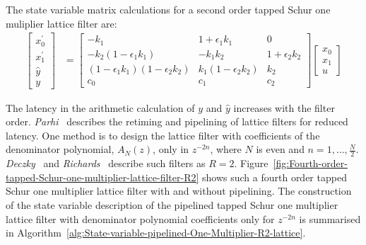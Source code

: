 \documentclass[a4paper,twoside,10pt,english]{article}
\begin{document}
The state variable matrix calculations for a second order tapped Schur one
muliplier lattice filter are:
\begin{align*}
  \left[\begin{array}{c}
    x_{0}^{\prime} \\
    x_{1}^{\prime} \\
    \hat{y} \\
    y\end{array}\right] &= 
  \left[\begin{array}{ccc}- k_{1} & 1+\epsilon_{1} k_{1} & 0\\
-k_{2}\left(1-\epsilon_{1}k_{1}\right) & -k_{1}k_{2}& 1+\epsilon_{2}k_{2} \\
 \left(1-\epsilon_{1}k_{1}\right)\left(1-\epsilon_{2}k_{2}\right) &
   k_{1}\left(1-\epsilon_{2}k_{2}\right) & k_{2} \\
 c_{0} & c_{1} & c_{2} \end{array}\right] \left[\begin{array}{c}
    x_{0} \\
    x_{1} \\
    u \end{array} \right]
\end{align*}

The latency in the arithmetic calculation of $y$ and $\hat{y}$
increases with the filter order. \emph{Parhi}~\cite[Chapter 4 and Section 12.8]
{Parhi_VLSIDigitalSignalProcessingSystems} describes the retiming and pipelining
of lattice filters for reduced latency. One method is to design the lattice
filter with coefficients of the denominator polynomial, $A_{N}\left(z\right)$,
only in $z^{-2n}$, where $N$ is even and $n=1,\hdots,\frac{N}{2}$.
\emph{Deczky}~\cite{Deczky_MinPSynthesisIIRDigitalFilters} and
\emph{Richards}~\cite{Richards_DeczkyRecursiveDecimator} describe such filters
as $R=2$.
Figure~\ref{fig:Fourth-order-tapped-Schur-one-multiplier-lattice-filter-R2}
shows such a fourth order tapped Schur one multiplier lattice filter with and
without pipelining.
The construction of the state variable description of the pipelined tapped Schur
one multiplier lattice filter with denominator polynomial coefficients only for
$z^{-2n}$ is summarised in
Algorithm~\ref{alg:State-variable-pipelined-One-Multiplier-R2-lattice}.
\end{document}
